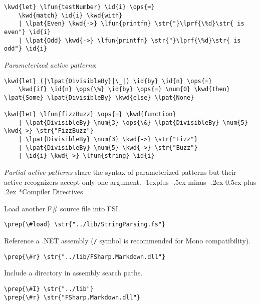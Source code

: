 \documentclass[10pt,landscape]{article}
\makeatletter
\renewcommand{\subsection}{\@startsection{subsection}{2}{0mm}%
                                {-1explus -.5ex minus -.2ex}%
                                {0.5ex plus .2ex}%
                                {\normalfont\normalsize\bfseries}}
\newcommand{\id}[1]{\textcolor[HTML]{000000}{#1}}
\newcommand{\str}[1]{\textcolor[HTML]{A31515}{#1}}
\newcommand{\kwd}[1]{\textcolor[HTML]{0000FF}{#1}}
\newcommand{\ops}[1]{\textcolor[HTML]{000000}{#1}}
\newcommand{\num}[1]{\textcolor[HTML]{000000}{#1}}
\newcommand{\lfun}[1]{\textcolor[HTML]{AA5500}{#1}}
\newcommand{\lpat}[1]{\textcolor[HTML]{800080}{#1}}
\newcommand{\lprf}[1]{\textcolor[HTML]{2B91AF}{#1}}
\newcommand{\prep}[1]{\textcolor[HTML]{0000FF}{#1}}
\makeatother
\begin{document}
\begin{multicols}{3}
\begin{Verbatim}[commandchars=\\\{\}]
\kwd{let} \lfun{testNumber} \id{i} \ops{=}
    \kwd{match} \id{i} \kwd{with}
    | \lpat{Even} \kwd{->} \lfun{printfn} \str{"}\lprf{\%d}\str{ is even"} \id{i}
    | \lpat{Odd} \kwd{->} \lfun{printfn} \str{"}\lprf{\%d}\str{ is odd"} \id{i}

\end{Verbatim}



\emph{Parameterized active patterns}:
\begin{Verbatim}[commandchars=\\\{\}]
\kwd{let} (|\lpat{DivisibleBy}|\_|) \id{by} \id{n} \ops{=} 
    \kwd{if} \id{n} \ops{\%} \id{by} \ops{=} \num{0} \kwd{then} \lpat{Some} \lpat{DivisibleBy} \kwd{else} \lpat{None}

\kwd{let} \lfun{fizzBuzz} \ops{=} \kwd{function} 
    | \lpat{DivisibleBy} \num{3} \ops{\&} \lpat{DivisibleBy} \num{5} \kwd{->} \str{"FizzBuzz"} 
    | \lpat{DivisibleBy} \num{3} \kwd{->} \str{"Fizz"} 
    | \lpat{DivisibleBy} \num{5} \kwd{->} \str{"Buzz"} 
    | \id{i} \kwd{->} \lfun{string} \id{i}

\end{Verbatim}



\emph{Partial active patterns} share the syntax of parameterized patterns but their active recognizers accept only one argument.
\subsection*{Compiler Directives}



Load another F\# source file into FSI.
\begin{Verbatim}[commandchars=\\\{\}]
\prep{\#load} \str{"../lib/StringParsing.fs"}

\end{Verbatim}



Reference a .NET assembly (\texttt{/} symbol is recommended for Mono compatibility).
\begin{Verbatim}[commandchars=\\\{\}]
\prep{\#r} \str{"../lib/FSharp.Markdown.dll"}

\end{Verbatim}



Include a directory in assembly search paths.
\begin{Verbatim}[commandchars=\\\{\}]
\prep{\#I} \str{"../lib"}
\prep{\#r} \str{"FSharp.Markdown.dll"}


\end{Verbatim}
\end{multicols}
\end{document}
